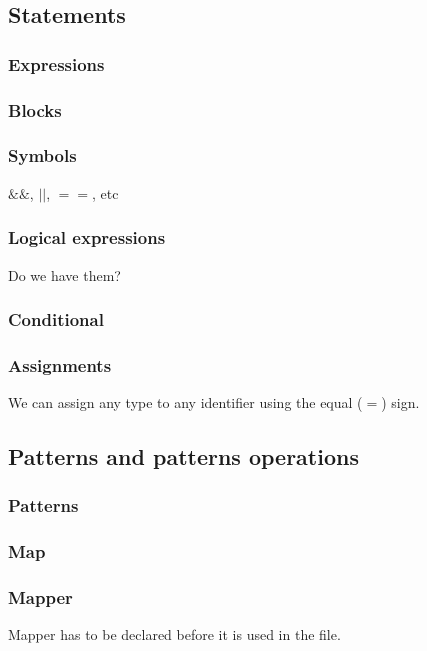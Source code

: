 \documentclass[11pt,twoside]{article}
\begin{document}
\subsection{Statements}

\subsubsection{Expressions}


\subsubsection{Blocks}


\subsubsection{Symbols}
$\&\&$, $||$, $==$, etc


\subsubsection{Logical expressions}
Do we have them?


\subsubsection{Conditional}


\subsubsection{Assignments}
We can assign any type to any identifier using the equal ($=$) sign.


\subsection{Patterns and patterns operations}

\subsubsection{Patterns}

\subsubsection{Map}

\subsubsection{Mapper}
Mapper has to be declared before it is used in the file.
\end{document}
